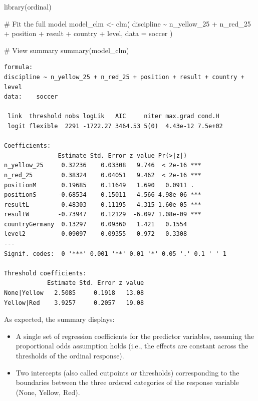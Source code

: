 \documentclass[
  letterpaper,
  DIV=11,
  numbers=noendperiod]{scrartcl}
\newenvironment{Shaded}{\begin{snugshade}}{\end{snugshade}}
\newcommand{\AttributeTok}[1]{\textcolor[rgb]{0.40,0.45,0.13}{#1}}
\newcommand{\CommentTok}[1]{\textcolor[rgb]{0.37,0.37,0.37}{#1}}
\newcommand{\FunctionTok}[1]{\textcolor[rgb]{0.28,0.35,0.67}{#1}}
\newcommand{\NormalTok}[1]{\textcolor[rgb]{0.00,0.23,0.31}{#1}}
\newcommand{\OtherTok}[1]{\textcolor[rgb]{0.00,0.23,0.31}{#1}}
\newcommand{\SpecialCharTok}[1]{\textcolor[rgb]{0.37,0.37,0.37}{#1}}
\begin{document}
\begin{Shaded}
\begin{Highlighting}[]
\FunctionTok{library}\NormalTok{(ordinal)}

\CommentTok{\# Fit the full model}
\NormalTok{model\_clm }\OtherTok{\textless{}{-}} \FunctionTok{clm}\NormalTok{(}
\NormalTok{  discipline }\SpecialCharTok{\textasciitilde{}}\NormalTok{ n\_yellow\_25 }\SpecialCharTok{+}\NormalTok{ n\_red\_25 }\SpecialCharTok{+}\NormalTok{ position }\SpecialCharTok{+} 
\NormalTok{               result }\SpecialCharTok{+}\NormalTok{ country }\SpecialCharTok{+}\NormalTok{ level,}
  \AttributeTok{data =}\NormalTok{ soccer}
\NormalTok{)}

\CommentTok{\# View summary}
\FunctionTok{summary}\NormalTok{(model\_clm)}
\end{Highlighting}
\end{Shaded}

\begin{verbatim}
formula: 
discipline ~ n_yellow_25 + n_red_25 + position + result + country + level
data:    soccer

 link  threshold nobs logLik   AIC     niter max.grad cond.H 
 logit flexible  2291 -1722.27 3464.53 5(0)  4.43e-12 7.5e+02

Coefficients:
               Estimate Std. Error z value Pr(>|z|)    
n_yellow_25     0.32236    0.03308   9.746  < 2e-16 ***
n_red_25        0.38324    0.04051   9.462  < 2e-16 ***
positionM       0.19685    0.11649   1.690   0.0911 .  
positionS      -0.68534    0.15011  -4.566 4.98e-06 ***
resultL         0.48303    0.11195   4.315 1.60e-05 ***
resultW        -0.73947    0.12129  -6.097 1.08e-09 ***
countryGermany  0.13297    0.09360   1.421   0.1554    
level2          0.09097    0.09355   0.972   0.3308    
---
Signif. codes:  0 '***' 0.001 '**' 0.01 '*' 0.05 '.' 0.1 ' ' 1

Threshold coefficients:
            Estimate Std. Error z value
None|Yellow   2.5085     0.1918   13.08
Yellow|Red    3.9257     0.2057   19.08
\end{verbatim}

As expected, the summary displays:

\begin{itemize}
\item
  A single set of regression coefficients for the predictor variables,
  assuming the proportional odds assumption holds (i.e., the effects are
  constant across the thresholds of the ordinal response).
\item
  Two intercepts (also called cutpoints or thresholds) corresponding to
  the boundaries between the three ordered categories of the response
  variable (None, Yellow, Red).
\end{itemize}
\end{document}
